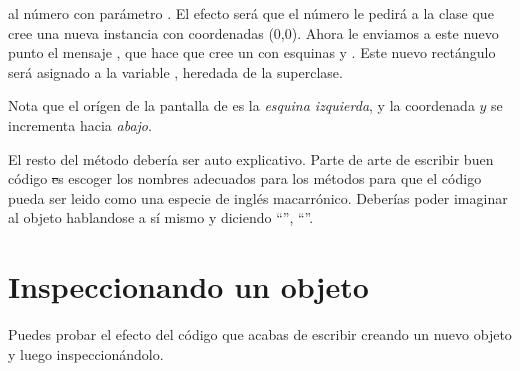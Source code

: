 \documentclass[a4paper,10pt,twoside]{book}
\begin{document}

al número  con parámetro .
El efecto será que el número  le pedirá a la clase  que cree una nueva instancia con coordenadas (0,0).
Ahora le enviamos a este nuevo punto el mensaje , que hace que cree un  con esquinas  y .
Este nuevo rectángulo será asignado a la variable , heredada de la superclase. 

Nota que el orígen de la pantalla de \pharo es la \emph{esquina izquierda}, y la coordenada $y$ se incrementa hacia \emph{abajo}.


El resto del método debería ser auto explicativo. 
Parte de arte de escribir buen código \st es escoger los nombres adecuados para los métodos para que el código pueda ser leido como una especie de inglés macarrónico. 
Deberías poder imaginar al objeto hablandose a sí mismo y diciendo ``'', ``''.

\section{Inspeccionando un objeto}

Puedes probar el efecto del código que acabas de escribir creando un nuevo objeto  y luego inspeccionándolo. 
\end{document}
